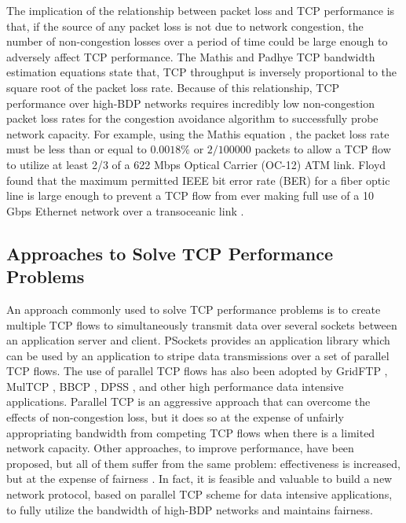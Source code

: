 \documentclass[a4paper, conference]{IEEEtran}
\begin{document}
The implication of the relationship between packet loss and TCP performance is that, if the source of any packet loss is not due to network congestion, the number of non-congestion losses over a period of time could be large enough to adversely affect TCP performance. The Mathis \cite{Mathis1997} and Padhye \cite{padhye1998} TCP bandwidth estimation equations state that, TCP throughput is inversely proportional to the square root of the packet loss rate. Because of this relationship, TCP performance over high-BDP networks requires incredibly low non-congestion packet loss rates for the congestion avoidance algorithm to successfully probe network capacity. For example, using the Mathis equation \cite{Mathis1997}, the packet loss rate must be less than or equal to $0.0018\%$ or $2/100000$ packets to allow a TCP flow to utilize at least 2/3 of a 622 Mbps Optical Carrier (OC-12) ATM link. Floyd found that the maximum permitted IEEE bit error rate (BER) for a fiber optic line is large enough to prevent a TCP flow from ever making full use of a 10 Gbps Ethernet network over a transoceanic link \cite{hacker2004}.

\subsection{Approaches to Solve TCP Performance Problems}

An approach commonly used to solve TCP performance problems is to create multiple TCP flows to simultaneously transmit data over several sockets between an application server and client. PSockets \cite{sivakumar2000} provides an application library which can be used by an application to stripe data transmissions over a set of parallel TCP flows. The use of parallel TCP flows has also been adopted by GridFTP \cite{allcock2005}, MulTCP \cite{crowcroft1998}, BBCP \cite{hanushevsky2001}, DPSS \cite{Tierney1994}, and other high performance data intensive applications. Parallel TCP is an aggressive approach that can overcome the effects of non-congestion loss, but it does so at the expense of unfairly appropriating bandwidth from competing TCP flows when there is a limited network capacity. Other approaches, to improve performance, have been proposed, but all of them suffer from the same problem: effectiveness is increased, but at the expense of fairness \cite{hacker2004}. In fact, it is feasible and valuable to build a new network protocol, based on parallel TCP scheme for data intensive applications, to fully utilize the bandwidth of high-BDP networks and maintains fairness.
\end{document}
